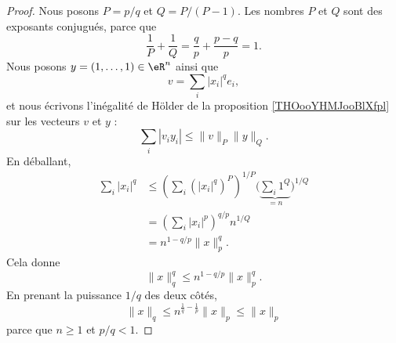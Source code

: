 \begin{proof}
	Nous posons \( P=p/q\) et \( Q=P/(P-1)\). Les nombres \( P\) et \( Q\) sont des exposants conjugués, parce que
	\begin{equation}
		\frac{1}{ P }+\frac{1}{ Q }=\frac{ q }{ p }+\frac{ p-q }{ p }=1.
	\end{equation}
	Nous posons \( y=(1,\ldots, 1)\in \eR^n\) ainsi que
	\begin{equation}
		v=\sum_i| x_i |^qe_i,
	\end{equation}
	et nous écrivons l'inégalité de Hölder de la proposition \ref{THOooYHMJooBlXfpl} sur les vecteurs \( v\) et \( y\) :
	\begin{equation}
		\sum_i| v_iy_i |\leq \| v \|_P\| y \|_Q.
	\end{equation}
	En déballant,
	\begin{subequations}
		\begin{align}
			\sum_i| x_i |^q & \leq  \left( \sum_i(| x_i |^q)^P \right)^{1/P}\big( \underbrace{\sum_i1^Q}_{=n} \big)^{1/Q} \\
			                & =   \left( \sum_i | x_i |^p \right)^{q/p}n^{1/Q}                                            \\
			                & =   n^{1-q/p}\| x \|_p^q.
		\end{align}
	\end{subequations}
	Cela donne
	\begin{equation}
		\| x \|_q^q\leq n^{1-q/p}\| x \|_p^q.
	\end{equation}
	En prenant la puissance \( 1/q\) des deux côtés,
	\begin{equation}
		\| x \|_q\leq   n^{\frac{1}{ q }-\frac{1}{ p }}   \| x \|_p\leq \| x \|_p
	\end{equation}
	parce que  \( n\geq 1\) et \( p/q<1\).
\end{proof}
